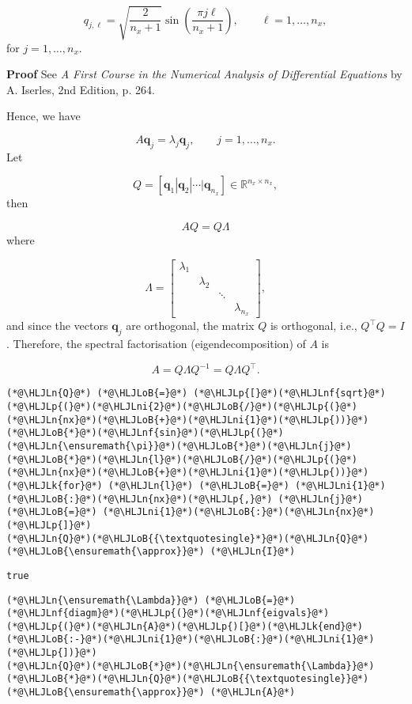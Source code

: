 \documentclass[12pt,a4paper]{article}
\newcommand{\HLJLk}[1]{\textcolor[RGB]{148,91,176}{\textbf{#1}}}
\newcommand{\HLJLn}[1]{#1}
\newcommand{\HLJLnf}[1]{\textcolor[RGB]{66,102,213}{#1}}
\newcommand{\HLJLni}[1]{\textcolor[RGB]{59,151,46}{#1}}
\newcommand{\HLJLoB}[1]{\textcolor[RGB]{102,102,102}{\textbf{#1}}}
\newcommand{\HLJLp}[1]{#1}
\begin{document}
\[
q_{j,\ell} = \sqrt{\frac{2}{n_x+1}}\sin\left(\frac{\pi j \ell}{n_x+1}   \right), \qquad \ell = 1, \ldots, n_x,
\]
for $j = 1, \ldots, n_x$.

\textbf{Proof} See \emph{A First Course in the Numerical Analysis of Differential Equations} by A. Iserles, 2nd Edition, p. 264.

Hence, we have

\[
A\mathbf{q}_j = \lambda_j\mathbf{q}_j, \qquad j = 1, \ldots, n_x.
\]
Let

\[
Q = \left[\mathbf{q}_1 |  \mathbf{q}_2 | \cdots | \mathbf{q}_{n_x}  \right] \in \mathbb{R}^{n_x \times n_x},
\]
then

\[
AQ = Q\Lambda
\]
where

\[
\Lambda = \begin{bmatrix}
\lambda_1 & & & \\
& \lambda_2 & & \\
 & & \ddots &  \\
&  & & \lambda_{n_x}
\end{bmatrix},
\]
and since the vectors $\mathbf{q}_j$ are orthogonal, the matrix $Q$ is orthogonal, i.e.,  $Q^{\top}Q = I$. Therefore, the spectral factorisation (eigendecomposition) of $A$ is

\[
A = Q\Lambda Q^{-1} =  Q\Lambda Q^{\top}.
\]

\begin{lstlisting}
(*@\HLJLn{Q}@*) (*@\HLJLoB{=}@*) (*@\HLJLp{[}@*)(*@\HLJLnf{sqrt}@*)(*@\HLJLp{(}@*)(*@\HLJLni{2}@*)(*@\HLJLoB{/}@*)(*@\HLJLp{(}@*)(*@\HLJLn{nx}@*)(*@\HLJLoB{+}@*)(*@\HLJLni{1}@*)(*@\HLJLp{))}@*)(*@\HLJLoB{*}@*)(*@\HLJLnf{sin}@*)(*@\HLJLp{(}@*)(*@\HLJLn{\ensuremath{\pi}}@*)(*@\HLJLoB{*}@*)(*@\HLJLn{j}@*)(*@\HLJLoB{*}@*)(*@\HLJLn{l}@*)(*@\HLJLoB{/}@*)(*@\HLJLp{(}@*)(*@\HLJLn{nx}@*)(*@\HLJLoB{+}@*)(*@\HLJLni{1}@*)(*@\HLJLp{))}@*) (*@\HLJLk{for}@*) (*@\HLJLn{l}@*) (*@\HLJLoB{=}@*) (*@\HLJLni{1}@*)(*@\HLJLoB{:}@*)(*@\HLJLn{nx}@*)(*@\HLJLp{,}@*) (*@\HLJLn{j}@*) (*@\HLJLoB{=}@*) (*@\HLJLni{1}@*)(*@\HLJLoB{:}@*)(*@\HLJLn{nx}@*)(*@\HLJLp{]}@*)
(*@\HLJLn{Q}@*)(*@\HLJLoB{{\textquotesingle}*}@*)(*@\HLJLn{Q}@*) (*@\HLJLoB{\ensuremath{\approx}}@*) (*@\HLJLn{I}@*)
\end{lstlisting}

\begin{lstlisting}
true
\end{lstlisting}


\begin{lstlisting}
(*@\HLJLn{\ensuremath{\Lambda}}@*) (*@\HLJLoB{=}@*) (*@\HLJLnf{diagm}@*)(*@\HLJLp{(}@*)(*@\HLJLnf{eigvals}@*)(*@\HLJLp{(}@*)(*@\HLJLn{A}@*)(*@\HLJLp{)[}@*)(*@\HLJLk{end}@*)(*@\HLJLoB{:-}@*)(*@\HLJLni{1}@*)(*@\HLJLoB{:}@*)(*@\HLJLni{1}@*)(*@\HLJLp{])}@*)
(*@\HLJLn{Q}@*)(*@\HLJLoB{*}@*)(*@\HLJLn{\ensuremath{\Lambda}}@*)(*@\HLJLoB{*}@*)(*@\HLJLn{Q}@*)(*@\HLJLoB{{\textquotesingle}}@*) (*@\HLJLoB{\ensuremath{\approx}}@*) (*@\HLJLn{A}@*)
\end{lstlisting}
\end{document}
